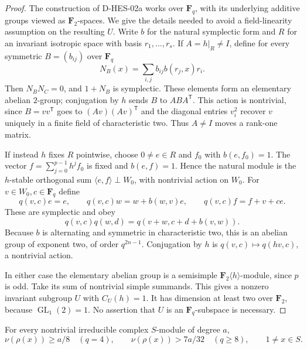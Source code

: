 \begin{proof}
The construction of D-HES-02a works over $\mathbf F_q$, with its
underlying additive groups viewed as $\mathbf F_2$-spaces. We give the
details needed to avoid a field-linearity assumption on the resulting
$U$. Write $b$ for the natural symplectic form and $R$ for an invariant
isotropic space with basis $r_1,\ldots,r_s$.
If $A=h|_R\ne I$, define for every symmetric $B=(b_{ij})$ over
$\mathbf F_q$
\[
               N_B(x)=\sum_{i,j}b_{ij}b(r_j,x)r_i.
\]
Then $N_BN_C=0$, and $1+N_B$ is symplectic. These elements form an
elementary abelian $2$-group; conjugation by $h$ sends $B$ to
$ABA^{\mathsf T}$. This action is nontrivial, since
$B=vv^{\mathsf T}$ goes to $(Av)(Av)^{\mathsf T}$ and the diagonal
entries $v_i^2$ recover $v$ uniquely in a finite field of characteristic
two. Thus $A\ne I$ moves a rank-one matrix.

If instead $h$ fixes $R$ pointwise, choose $0\ne e\in R$ and $f_0$
with $b(e,f_0)=1$. The vector $f=\sum_{j=0}^{p-1}h^jf_0$ is fixed and
$b(e,f)=1$. Hence the natural module is the $h$-stable orthogonal sum
$\langle e,f\rangle\perp W_0$, with nontrivial action on $W_0$.
For $v\in W_0,c\in\mathbf F_q$ define
\[
 q(v,c)e=e,\qquad q(v,c)w=w+b(w,v)e,\qquad q(v,c)f=f+v+ce.
\]
These are symplectic and obey
\[
          q(v,c)q(w,d)=q(v+w,c+d+b(v,w)).
\tag{HES.15}
\]
Because $b$ is alternating and symmetric in characteristic two, this
is an abelian group of exponent two, of order $q^{2n-1}$. Conjugation
by $h$ is $q(v,c)\mapsto q(hv,c)$, a nontrivial action.

In either case the elementary abelian group is a semisimple
$\mathbf F_2\langle h\rangle$-module, since $p$ is odd. Take its sum of
nontrivial simple summands. This gives a nonzero invariant subgroup
$U$ with $C_U(h)=1$. It has dimension at least two over $\mathbf F_2$,
because $\operatorname{GL}_1(2)=1$. No assertion that $U$ is an
$\mathbf F_q$-subspace is necessary.
\end{proof}

\begin{lemma}[D-HES-04b]
For every nontrivial irreducible complex $S$-module of degree $a$,
\[
 \nu(\rho(x))\ge a/8\quad(q=4),\qquad
 \nu(\rho(x))>7a/32\quad(q\ge8),\qquad 1\ne x\in S.
\tag{HES.16}
\]
\end{lemma}

